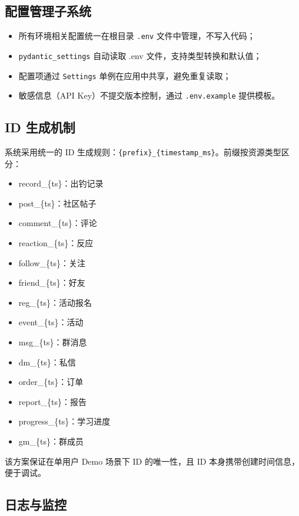 \documentclass[12pt,a4paper]{ctexart}
\begin{document}
\subsection{配置管理子系统}

\begin{itemize}
  \item 所有环境相关配置统一在根目录 \texttt{.env} 文件中管理，不写入代码；
  \item \texttt{pydantic\_settings} 自动读取 .env 文件，支持类型转换和默认值；
  \item 配置项通过 \texttt{Settings} 单例在应用中共享，避免重复读取；
  \item 敏感信息（API Key）不提交版本控制，通过 \texttt{.env.example} 提供模板。
\end{itemize}

\subsection{ID 生成机制}

系统采用统一的 ID 生成规则：\texttt{\{prefix\}\_\{timestamp\_ms\}}。前缀按资源类型区分：
\begin{itemize}
  \item record\_\{ts\}：出钓记录
  \item post\_\{ts\}：社区帖子
  \item comment\_\{ts\}：评论
  \item reaction\_\{ts\}：反应
  \item follow\_\{ts\}：关注
  \item friend\_\{ts\}：好友
  \item reg\_\{ts\}：活动报名
  \item event\_\{ts\}：活动
  \item msg\_\{ts\}：群消息
  \item dm\_\{ts\}：私信
  \item order\_\{ts\}：订单
  \item report\_\{ts\}：报告
  \item progress\_\{ts\}：学习进度
  \item gm\_\{ts\}：群成员
\end{itemize}

该方案保证在单用户 Demo 场景下 ID 的唯一性，且 ID 本身携带创建时间信息，便于调试。

\subsection{日志与监控}
\end{document}
